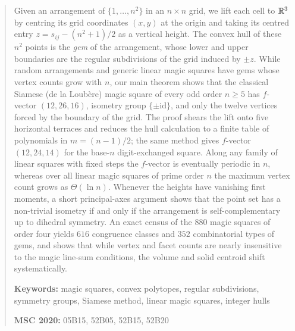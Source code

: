 \begin{abstract}
Given an arrangement of $\{1,\dots,n^2\}$ in an $n\times n$ grid, we lift each cell to $\R^3$ by centring its grid coordinates $(x,y)$ at the origin and taking its centred entry $z = s_{ij} - (n^2+1)/2$ as a vertical height. The convex hull of these $n^2$ points is the \emph{gem} of the arrangement, whose lower and upper boundaries are the regular subdivisions of the grid induced by $\pm z$. While random arrangements and generic linear magic squares have gems whose vertex counts grow with $n$, our main theorem shows that the classical Siamese (de la Loub\`ere) magic square of every odd order $n\ge5$ has $f$-vector $(12,26,16)$, isometry group $\{\pm\mathrm{id}\}$, and only the twelve vertices forced by the boundary of the grid. The proof shears the lift onto five horizontal terraces and reduces the hull calculation to a finite table of polynomials in $m=(n-1)/2$; the same method gives $f$-vector $(12,24,14)$ for the base-$n$ digit-exchanged square. Along any family of linear squares with fixed steps the $f$-vector is eventually periodic in $n$, whereas over all linear magic squares of prime order $n$ the maximum vertex count grows as $\Theta(\ln n)$. Whenever the heights have vanishing first moments, a short principal-axes argument shows that the point set has a non-trivial isometry if and only if the arrangement is self-complementary up to dihedral symmetry. An exact census of the $880$ magic squares of order four yields $616$ congruence classes and $352$ combinatorial types of gems, and shows that while vertex and facet counts are nearly insensitive to the magic line-sum conditions, the volume and solid centroid shift systematically.
\medskip

\noindent\textbf{Keywords:} magic squares, convex polytopes, regular subdivisions, symmetry groups, Siamese method, linear magic squares, integer hulls

\noindent\textbf{MSC 2020:} 05B15, 52B05, 52B15, 52B20
\end{abstract}
